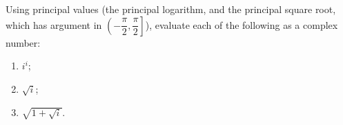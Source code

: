 Using principal values (the principal logarithm, and the principal square root, which has argument in $\left(-\dfrac{\pi}{2},\dfrac{\pi}{2}\right]$), evaluate each of the following as a complex number:
\begin{enumerate}
\item[(a)] $i^i$;
\item[(b)] $\sqrt i$;
\item[(c)] $\sqrt{1+\sqrt i}$.
\end{enumerate}
